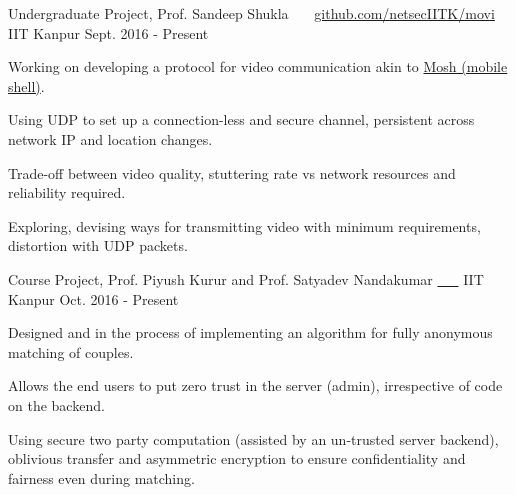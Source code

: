 


\begin{cventries}


  \cventry
  {Undergraduate Project, Prof. Sandeep Shukla}
  {\href{https://github.com/netsecIITK/moVi}{}
    \ \ \ \normalfont\href{https://github.com/netsecIITK/moVi}
    {github.com/netsecIITK/movi}}
  {IIT Kanpur}
  {Sept. 2016 - Present}
  {
    \begin{cvitems}
    \item Working on developing a protocol for video communication
      akin to \href{https://mosh.org/}{Mosh (mobile shell)}.
    \item Using UDP to set up a connection-less and secure channel,
      persistent across network IP and location changes.
    \item Trade-off between video quality, stuttering rate vs network
      resources and reliability required.
    \item Exploring, devising ways for transmitting video
      with minimum requirements, distortion with UDP packets.
    \end{cvitems}
  }

  \cventry
  {Course Project, Prof. Piyush Kurur and
    Prof. Satyadev Nandakumar}
  {\href{https://github.com/pclubiitk/puppy-love}{
      \ \ \ }}
  {IIT Kanpur}
  {Oct. 2016 - Present}
  {
    \begin{cvitems}
      \item Designed and in the process of implementing an algorithm
        for fully anonymous matching of couples.
      \item Allows the end users to put zero trust in the server
        (admin), irrespective of code on the backend.
      \item Using secure two party computation (assisted by an
        un-trusted server backend), oblivious transfer and asymmetric
        encryption to ensure confidentiality and fairness even during
        matching.
    \end{cvitems}
  }


\end{cventries}
